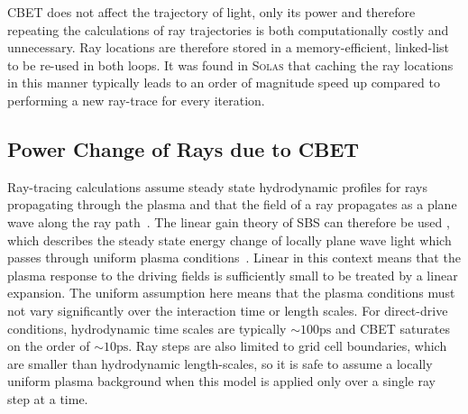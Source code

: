 \ac{CBET} does not affect the trajectory of light, only its power and therefore repeating the calculations of ray trajectories is both computationally costly and unnecessary.
Ray locations are therefore stored in a memory-efficient, linked-list to be re-used in both loops.
It was found in \textsc{Solas} that caching the ray locations in this manner typically leads to an order of magnitude speed up compared to performing a new ray-trace for every iteration.

\subsection{Power Change of Rays due to CBET}%
\label{sec:SOLAS_ray_power_change}

Ray-tracing calculations assume steady state hydrodynamic profiles for rays propagating through the plasma and that the field of a ray propagates as a plane wave along the ray path~\cite{ding_identify_2020}.
The linear gain theory of \ac{SBS} can therefore be used \cite{randall_theory_1981}, which describes the steady state energy change of locally plane wave light which passes through uniform plasma conditions~\cite{myatt_wave-based_2017}.
Linear in this context means that the plasma response to the driving fields is sufficiently small to be treated by a linear expansion.
The uniform assumption here means that the plasma conditions must not vary significantly over the interaction time or length scales.
For direct-drive conditions, hydrodynamic time scales are typically $\sim100 \text{ps}$ and \ac{CBET} saturates on the order of $\sim10 \text{ps}$.
Ray steps are also limited to grid cell boundaries, which are smaller than hydrodynamic length-scales, so it is safe to assume a locally uniform plasma background when this model is applied only over a single ray step at a time.

